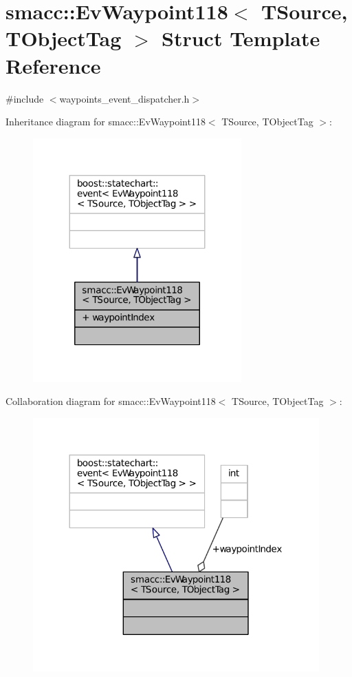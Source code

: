\hypertarget{structsmacc_1_1EvWaypoint118}{}\section{smacc\+:\+:Ev\+Waypoint118$<$ T\+Source, T\+Object\+Tag $>$ Struct Template Reference}
\label{structsmacc_1_1EvWaypoint118}


{\ttfamily \#include $<$waypoints\+\_\+event\+\_\+dispatcher.\+h$>$}



Inheritance diagram for smacc\+:\+:Ev\+Waypoint118$<$ T\+Source, T\+Object\+Tag $>$\+:
\nopagebreak
\begin{figure}[H]
\begin{center}
\leavevmode
\includegraphics[width=227pt]{structsmacc_1_1EvWaypoint118__inherit__graph}
\end{center}
\end{figure}


Collaboration diagram for smacc\+:\+:Ev\+Waypoint118$<$ T\+Source, T\+Object\+Tag $>$\+:
\nopagebreak
\begin{figure}[H]
\begin{center}
\leavevmode
\includegraphics[width=312pt]{structsmacc_1_1EvWaypoint118__coll__graph}
\end{center}
\end{figure}

